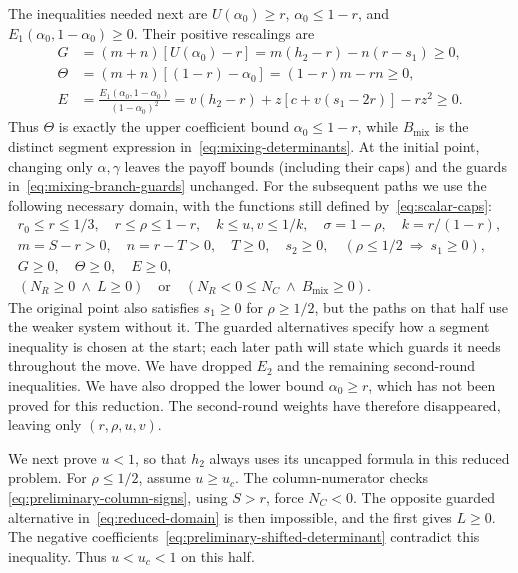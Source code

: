 \documentclass[11pt]{article}
\theoremstyle{remark}
\theoremstyle{plain}
\begin{document}
The inequalities needed next are $U(\alpha_0)\ge r$, $\alpha_0\le1-r$,
and $E_1(\alpha_0,1-\alpha_0)\ge0$. Their positive rescalings are
\begin{equation}
 \begin{aligned}
 G&=(m+n)[U(\alpha_0)-r]
       =m(h_2-r)-n(r-s_1)\ge0,\\
 \Theta&=(m+n)[(1-r)-\alpha_0]
       =(1-r)m-rn\ge0,\\
 E&=\frac{E_1(\alpha_0,1-\alpha_0)}{(1-\alpha_0)^2}
       =v(h_2-r)+z[c+v(s_1-2r)]-rz^2\ge0.
 \end{aligned}
 \label{eq:relaxed}
\end{equation}
Thus $\Theta$ is exactly the upper coefficient bound
$\alpha_0\le1-r$, while $B_{\mathrm{mix}}$ is the distinct segment
expression in~\eqref{eq:mixing-determinants}. At the initial point,
changing only $\alpha,\gamma$ leaves the payoff bounds (including
their caps) and the guards in~\eqref{eq:mixing-branch-guards}
unchanged. For the subsequent paths we use the following necessary
domain, with the functions still defined by~\eqref{eq:scalar-caps}:
\begin{equation}
 \begin{gathered}
 r_0\le r\le1/3,\quad r\le\rho\le1-r,\quad
 k\le u,v\le1/k,\quad \sigma=1-\rho,\quad k=r/(1-r),\\
 m=S-r>0,\quad n=r-T>0,\quad T\ge0,\quad s_2\ge0,\quad
 (\rho\le1/2\ \Longrightarrow\ s_1\ge0),\\
 G\ge0,\quad \Theta\ge0,\quad E\ge0,\\
 (N_R\ge0\ \land\ L\ge0)
 \quad\text{or}\quad
 (N_R<0\le N_C\ \land\ B_{\mathrm{mix}}\ge0).
 \end{gathered}
 \label{eq:reduced-domain}
\end{equation}
The original point also satisfies $s_1\ge0$ for $\rho\ge1/2$,
but the paths on that half use the weaker system without it.
The guarded alternatives specify how a segment inequality is chosen
at the start; each later path will state which guards it needs
throughout the move. We have dropped $E_2$ and the remaining
second-round inequalities. We have also dropped the lower bound
$\alpha_0\ge r$, which has not been proved for this reduction.
The second-round weights have therefore disappeared, leaving only
$(r,\rho,u,v)$.

We next prove $u<1$, so that $h_2$ always uses its uncapped formula
in this reduced problem. For $\rho\le1/2$, assume $u\ge u_c$.
The column-numerator checks
\eqref{eq:preliminary-column-signs}, using $S>r$, force $N_C<0$.
The opposite guarded alternative in~\eqref{eq:reduced-domain}
is then impossible, and the first gives $L\ge0$. The negative
coefficients~\eqref{eq:preliminary-shifted-determinant} contradict
this inequality. Thus $u<u_c<1$ on this half.
\end{document}

